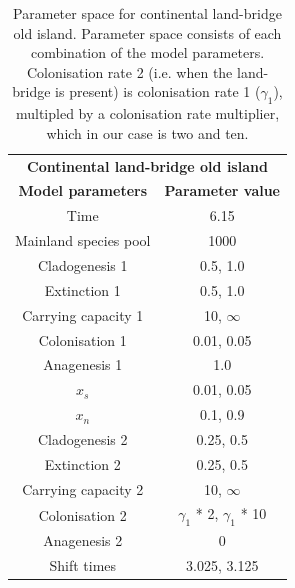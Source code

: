 \begin{table}[ht]
    \centering
    \caption{Parameter space for continental land-bridge old island. Parameter space consists of each combination of the model parameters. Colonisation rate 2 (i.e. when the land-bridge is present) is colonisation rate 1 ($\gamma_1$), multipled by a colonisation rate multiplier, which in our case is two and ten.}
    \begin{tabular}{ c | c }
        \multicolumn{2}{c}{\textbf{Continental land-bridge old island}} \\
        \textbf{Model parameters} & \textbf{Parameter value} \\ 
        \hline
        \hline
        Time & 6.15 \\
        \hline
        Mainland species pool & 1000 \\
        \hline
        Cladogenesis 1 & 0.5, 1.0 \\
        \hline
        Extinction 1 & 0.5, 1.0 \\
        \hline
        Carrying capacity 1 & 10, $\infty$ \\
        \hline
        Colonisation 1 & 0.01, 0.05 \\
        \hline
        Anagenesis 1 & 1.0 \\
        \hline
        $x_s$ & 0.01, 0.05 \\
        \hline
        $x_n$ & 0.1, 0.9 \\
        \hline
        Cladogenesis 2 & 0.25, 0.5 \\
        \hline
        Extinction 2 & 0.25, 0.5 \\
        \hline
        Carrying capacity 2 & 10, $\infty$ \\
        \hline
        Colonisation 2 & $\gamma_1$ * 2, $\gamma_1$ * 10 \\ 
        \hline 
        Anagenesis 2 & 0 \\
        \hline
        Shift times & 3.025, 3.125 \\
    \end{tabular}
    \label{tab:continental_lb_old}
\end{table}
